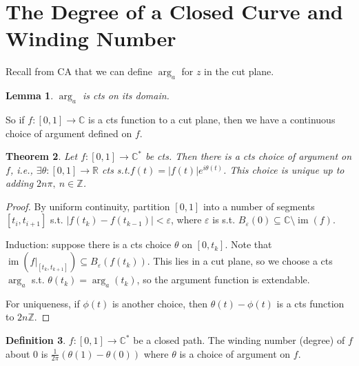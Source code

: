 \documentclass{article}
\theoremstyle{definition}
\newtheorem{defn}{Definition}[section]
\theoremstyle{remark}
\theoremstyle{plain}
\newtheorem{lem}[defn]{Lemma}
\newtheorem{thm}[defn]{Theorem}
\newcommand{\ZZ}{\mathbb{Z}}
\newcommand{\RR}{\mathbb{R}}
\newcommand{\CC}{\mathbb{C}}
\newcommand{\im}{\operatorname{im}}
\begin{document}
\section{The Degree of a Closed Curve and Winding Number}
Recall from CA that we can define $\operatorname{arg}_a$ for $z$ in the cut plane.
\begin{lem}
    $\arg_a$ is cts on its domain.
\end{lem}
So if $f:[0,1]\to \CC$ is a cts function to a cut plane, then we have a continuous choice of argument defined on $f$.
\begin{thm}
    Let $f:[0,1]\to\CC^\ast$ be cts. Then there is a cts choice of argument on $f$, i.e., $\exists\theta:[0,1]\to\RR$ cts s.t.$f(t)=|f(t)|e^{i\theta(t)}$. This choice is unique up to adding $2n\pi,\ n\in\ZZ$.
\end{thm}
\begin{proof}
    By uniform continuity, partition $[0,1]$ into a number of segments $[t_i,t_{i+1}]$ s.t. $|f(t_k)-f(t_{k-1})|<\varepsilon$, where $\varepsilon$ is s.t. $B_\varepsilon(0)\subseteq \CC\setminus\im(f)$. 

    Induction: suppose there is a cts choice $\theta$ on $[0,t_k]$. Note that $\im(f|_{[t_k,t_{k+1}]})\subseteq B_\varepsilon(f(t_k))$. This lies in a cut plane, so we choose a cts $\operatorname{arg}_a$ s.t. $\theta(t_k)=\arg_a(t_k)$, so the argument function is extendable.

    For uniqueness, if $\phi(t)$ is another choice, then $\theta(t)-\phi(t)$ is a cts function to $2n\ZZ$.
\end{proof}
\begin{defn}
    $f:[0,1]\to\CC^\ast$ be a closed path. The winding number (degree) of $f$ about $0$ is $\frac{1}{2\pi}(\theta(1)-\theta(0))$ where $\theta$ is a choice of argument on $f$.
\end{defn}
\end{document}
